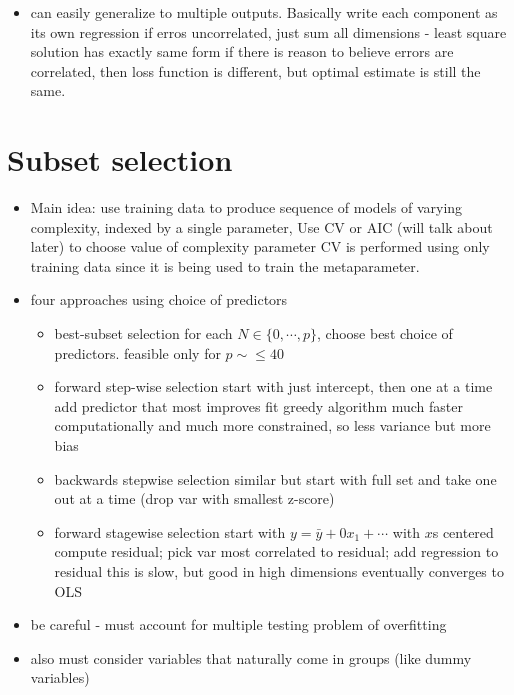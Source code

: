 \documentclass[a4paper]{report}
\newcommand{\<}{\textless}
\newcommand{\yb}{\bar{y}}
\renewcommand{\>}{\textgreater}
\begin{document}
\begin{itemize}
\begin{itemize}
     \end{itemize}
   \item can easily generalize to multiple outputs.
     \subitem Basically write each component as its own regression
     \subitem if erros uncorrelated, just sum all dimensions - least square solution has exactly same form
     \subitem if there is reason to believe errors are correlated, then loss function is different, but optimal estimate is still the same.
\end{itemize}

\section{Subset selection}
\begin{itemize}
  \item Main idea: use training data to produce sequence of models of varying complexity, indexed by a single parameter,
    \subitem Use CV or AIC (will talk about later) to choose value of complexity parameter
    \subitem CV is performed using only training data since it is being used to train the metaparameter.
  \item four approaches using choice of predictors
    \begin{itemize}
      \item best-subset selection
	\subitem for each $N \in \{ 0, \cdots, p\}$, choose best choice of predictors.
      \subitem feasible only for $p \sim\leq 40$
      \item forward step-wise selection
	\subitem start with just intercept, then one at a time add predictor that most improves fit
	\subitem greedy algorithm
	\subitem much faster computationally and much more constrained, so less variance but more bias
      \item backwards stepwise selection
	\subitem similar but start with full set and take one out at a time (drop var with smallest z-score)
      \item forward stagewise selection
	\subitem start with $ y = \yb + 0x_1 + \cdots $ with $x$s centered
	\subitem compute residual; pick var most correlated to residual; add regression to residual
	\subitem this is slow, but good in high dimensions
	\subitem eventually converges to OLS
    \end{itemize}
  \item be careful - must account for multiple testing problem of overfitting
  \item also must consider variables that naturally come in groups (like dummy variables)

\end{itemize}
\end{document}
